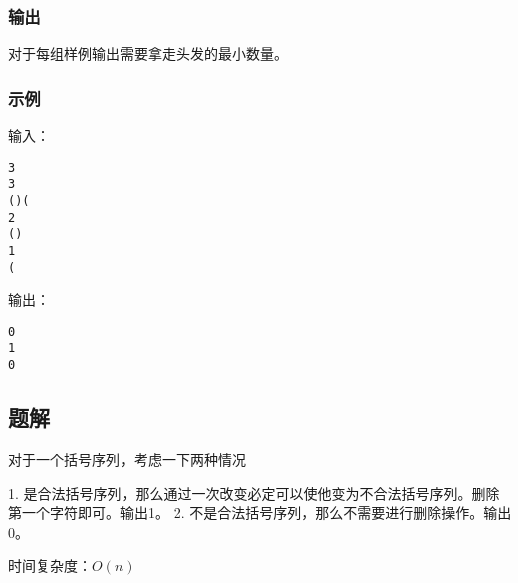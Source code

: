\subsubsection{输出}
对于每组样例输出需要拿走头发的最小数量。

\subsubsection{示例}
输入：
\begin{lstlisting}
3
3
()(
2
()
1
(
\end{lstlisting}

输出：
\begin{lstlisting}
0
1
0
\end{lstlisting}

\subsection{题解}

对于一个括号序列，考虑一下两种情况

1. 是合法括号序列，那么通过一次改变必定可以使他变为不合法括号序列。删除第一个字符即可。输出1。
2. 不是合法括号序列，那么不需要进行删除操作。输出0。

时间复杂度：$O(n)$
